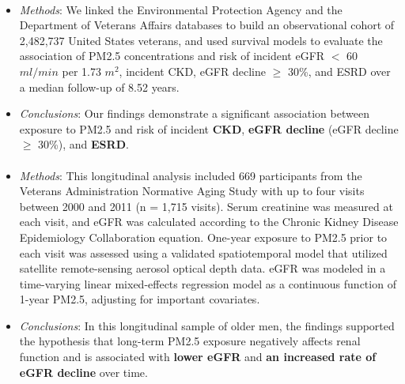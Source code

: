 \documentclass[11pt]{article}
\begin{document}
\paragraph{\citet{bowe2018particulate}}
\begin{itemize}
    \item \textit{Methods}:  We linked the Environmental Protection Agency and the Department of Veterans Affairs databases to build an observational cohort of 2,482,737 United States veterans, and used survival models to evaluate the association of PM2.5 concentrations and risk of incident eGFR $<$ 60 $ml/min$ per 1.73 $m^2$, incident CKD, eGFR decline $\geq$ 30\%, and ESRD over a median follow-up of 8.52 years.
    \item \textit{Conclusions}: Our findings demonstrate a significant association between exposure to PM2.5 and risk of incident \textbf{CKD}, \textbf{eGFR decline} (eGFR decline $\geq$ 30\%), and \textbf{ESRD}.
\end{itemize}

\paragraph{\citet{mehta2016long}}
\begin{itemize}
    \item \textit{Methods}: This longitudinal analysis included 669 participants from the Veterans Administration Normative Aging Study with up to four visits between 2000 and 2011 (n = 1,715 visits). Serum creatinine was measured at each visit, and eGFR was calculated according to the Chronic Kidney Disease Epidemiology Collaboration equation. One-year exposure to PM2.5 prior to each visit was assessed using a validated spatiotemporal model that utilized satellite remote-sensing aerosol optical depth data. eGFR was modeled in a time-varying linear mixed-effects regression model as a continuous function of 1-year PM2.5, adjusting for important covariates.
    \item \textit{Conclusions}: In this longitudinal sample of older men, the findings supported the hypothesis that long-term PM2.5 exposure negatively affects renal function and is associated with \textbf{lower eGFR} and \textbf{an increased rate of eGFR decline} over time.
\end{itemize}
\end{document}
